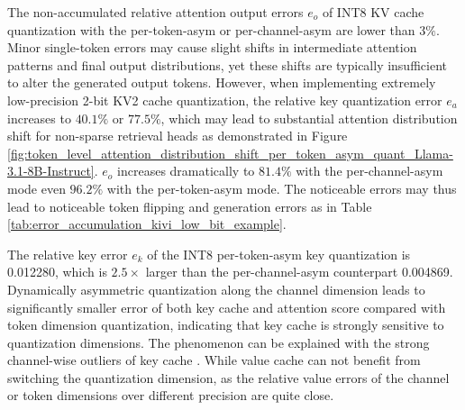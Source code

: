 The non-accumulated relative attention output errors $e_o$ of INT8 KV cache quantization with the per-token-asym or per-channel-asym are lower than $3\%$. Minor single-token errors may cause slight shifts in intermediate attention patterns and final output distributions, yet these shifts are typically insufficient to alter the generated output tokens.
However, when implementing extremely low-precision 2-bit KV2 cache quantization, the relative key quantization error $e_a$ increases to $40.1\%$ or $77.5\%$, which may lead to substantial attention distribution shift for non-sparse retrieval heads as demonstrated in Figure \ref{fig:token_level_attention_distribution_shift_per_token_asym_quant_Llama-3.1-8B-Instruct}. $e_o$ increases dramatically to $81.4\%$ with the per-channel-asym mode even $96.2\%$ with the per-token-asym mode. The noticeable errors may thus lead to noticeable token flipping and generation errors as in Table \ref{tab:error_accumulation_kivi_low_bit_example}.

The relative key error $e_k$ of the INT8 per-token-asym key quantization is 0.012280, which is $2.5 \times$ larger than the per-channel-asym counterpart 0.004869. Dynamically asymmetric quantization along the channel dimension leads to significantly smaller error of both key cache and attention score compared with token dimension quantization, indicating that key cache is strongly sensitive to quantization dimensions. The phenomenon can be explained with the strong channel-wise outliers of key cache \cite{liu2024kivi, hooper2024kvquant}. While value cache can not benefit from switching the quantization dimension, as the relative value errors of the channel or token dimensions over different precision are quite close. 

